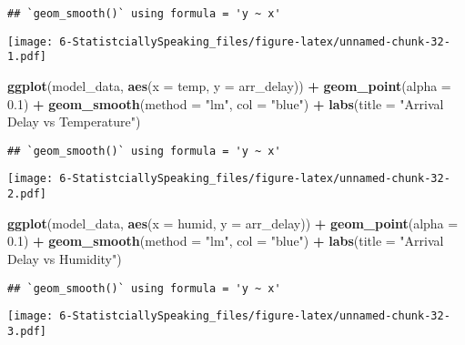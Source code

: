 \documentclass[
]{article}
\newenvironment{Shaded}{\begin{snugshade}}{\end{snugshade}}
\newcommand{\AttributeTok}[1]{\textcolor[rgb]{0.13,0.29,0.53}{#1}}
\newcommand{\FloatTok}[1]{\textcolor[rgb]{0.00,0.00,0.81}{#1}}
\newcommand{\FunctionTok}[1]{\textcolor[rgb]{0.13,0.29,0.53}{\textbf{#1}}}
\newcommand{\NormalTok}[1]{#1}
\newcommand{\SpecialCharTok}[1]{\textcolor[rgb]{0.81,0.36,0.00}{\textbf{#1}}}
\newcommand{\StringTok}[1]{\textcolor[rgb]{0.31,0.60,0.02}{#1}}
\begin{document}
\begin{verbatim}
## `geom_smooth()` using formula = 'y ~ x'
\end{verbatim}

\texttt{[image: 6-StatistciallySpeaking\_files/figure-latex/unnamed-chunk-32-1.pdf]}

\begin{Shaded}
\begin{Highlighting}[]
\FunctionTok{ggplot}\NormalTok{(model\_data, }\FunctionTok{aes}\NormalTok{(}\AttributeTok{x =}\NormalTok{ temp, }\AttributeTok{y =}\NormalTok{ arr\_delay)) }\SpecialCharTok{+}
  \FunctionTok{geom\_point}\NormalTok{(}\AttributeTok{alpha =} \FloatTok{0.1}\NormalTok{) }\SpecialCharTok{+}
  \FunctionTok{geom\_smooth}\NormalTok{(}\AttributeTok{method =} \StringTok{"lm"}\NormalTok{, }\AttributeTok{col =} \StringTok{"blue"}\NormalTok{) }\SpecialCharTok{+}
  \FunctionTok{labs}\NormalTok{(}\AttributeTok{title =} \StringTok{"Arrival Delay vs Temperature"}\NormalTok{)}
\end{Highlighting}
\end{Shaded}

\begin{verbatim}
## `geom_smooth()` using formula = 'y ~ x'
\end{verbatim}

\texttt{[image: 6-StatistciallySpeaking\_files/figure-latex/unnamed-chunk-32-2.pdf]}

\begin{Shaded}
\begin{Highlighting}[]
\FunctionTok{ggplot}\NormalTok{(model\_data, }\FunctionTok{aes}\NormalTok{(}\AttributeTok{x =}\NormalTok{ humid, }\AttributeTok{y =}\NormalTok{ arr\_delay)) }\SpecialCharTok{+}
  \FunctionTok{geom\_point}\NormalTok{(}\AttributeTok{alpha =} \FloatTok{0.1}\NormalTok{) }\SpecialCharTok{+}
  \FunctionTok{geom\_smooth}\NormalTok{(}\AttributeTok{method =} \StringTok{"lm"}\NormalTok{, }\AttributeTok{col =} \StringTok{"blue"}\NormalTok{) }\SpecialCharTok{+}
  \FunctionTok{labs}\NormalTok{(}\AttributeTok{title =} \StringTok{"Arrival Delay vs Humidity"}\NormalTok{)}
\end{Highlighting}
\end{Shaded}

\begin{verbatim}
## `geom_smooth()` using formula = 'y ~ x'
\end{verbatim}

\texttt{[image: 6-StatistciallySpeaking\_files/figure-latex/unnamed-chunk-32-3.pdf]}
\end{document}
